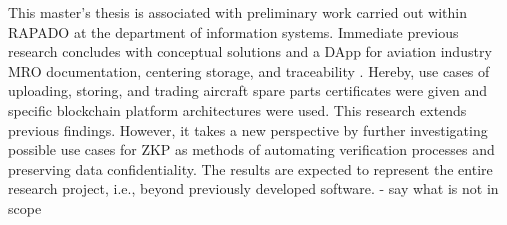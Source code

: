 This master's thesis is associated with preliminary work carried out within RAPADO at the department of information systems. Immediate previous research concludes with conceptual solutions and a DApp for aviation industry MRO documentation, centering storage, and traceability \citep{ZedelJ, semesterproject}. Hereby, use cases of uploading, storing, and trading aircraft spare parts certificates were given and specific blockchain platform architectures were used. This research extends previous findings. However, it takes a new perspective by further investigating possible use cases for ZKP as methods of automating verification processes and preserving data confidentiality. The results are expected to represent the entire research project, i.e., beyond previously developed software.
- say what is not in scope
\begin{comment}
I. Systematic literature review according to vom Brocke, Cooper and Webster: 
    1. Definition of Scope
        - classification, examples, challenges and evaluation methods of zero knowledge proof protocols 
        
    2. Conceptualization
        - work with concept map
        - derive at a search string
        
    3. Literature Search and Selection
        - look for review paper first to get good overview about the topic
        a) exclude paper that are too old and have too few citations and/or low impact factor (e.g. 5.5 is high)
        b) exclusion acc. to title and keywords
        c) exclusion acc. to abstract & structure of paper & RQ
        c) exclusion acc. to full text & availability of resource
        
    4. Synthesizing of Literature
        - cluster definitions, examples, drawbacks and evaluation methods (first suggestion can be found in the preliminary agenda)
        - write overview section about ZKP (Chapter 4)
- - - - - - -
How to know if a paper is useful for me?
1.title 2.keywords 3.abstract 4.structure of the paper 5.examples/use cases 6.research question/formal problem definition
- - - - - - -
II. Design Science Research
- DSR method acc. to Peffers and Hevner

\end{comment}
\begin{comment}
2) Ziel der Arbeit, scope of work
- not scope to practically integrate any of the concepts into existing DApp or any other existing system
- welche use cases gibt es f{"u}r ZKPs in RAPADO
- wie k{"o}nnte man diese Umsetzen

4) Ergebnisse skizzieren
- implementation can be a proof of concept, software artifact depends highly on complexity of the use case
\end{comment}